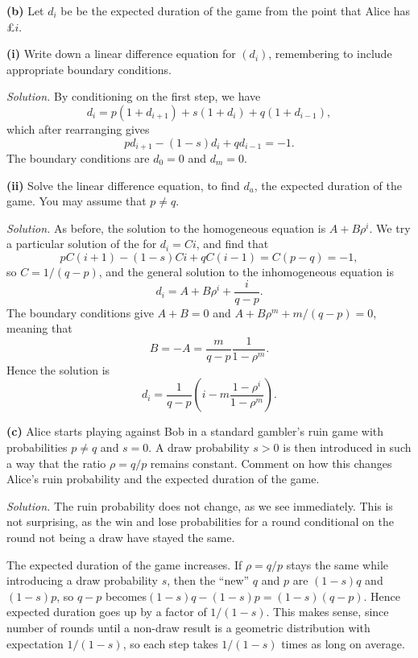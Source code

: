 \documentclass[
  a4paper,
]{article}
\theoremstyle{definition}
\theoremstyle{definition}
\theoremstyle{definition}
\theoremstyle{remark}
\begin{document}
\textbf{(b)} Let \(d_i\) be be the expected duration of the game from the point that Alice has £\(i\).

\textbf{(i)} Write down a linear difference equation for \((d_i)\), remembering to include appropriate boundary conditions.

\begin{myanswers}
\emph{Solution.} By conditioning on the first step, we have
\[ d_i = p(1 + d_{i+1}) + s(1 + d_i) + q(1 + d_{i-1}) ,  \]
which after rearranging gives
\[ pd_{i+1} - (1-s)d_i + qd_{i-1} = -1.  \]
The boundary conditions are \(d_0 = 0\) and \(d_m = 0\).

\end{myanswers}

\textbf{(ii)} Solve the linear difference equation, to find \(d_a\), the expected duration of the game. You may assume that \(p \neq q\).

\begin{myanswers}
\emph{Solution.} As before, the solution to the homogeneous equation is \(A + B\rho^i\). We try a particular solution of the for \(d_i = Ci\), and find that
\[ pC(i+1) -(1-s)Ci + qC(i-1) = C(p-q) = -1 ,\]
so \(C= 1/(q-p)\), and the general solution to the inhomogeneous equation is
\[ d_i = A + B\rho^i + \frac{i}{q-p} .  \]
The boundary conditions give \(A + B = 0\) and \(A + B \rho^m + m/(q-p) = 0\), meaning that
\[ B = -A = \frac{m}{q-p} \frac{1}{1-\rho^m} . \]
Hence the solution is
\[ d_i = \frac{1}{q-p} \left(i - m\frac{1-\rho^i}{1-\rho^m} \right) .   \]

\end{myanswers}

\textbf{(c)} Alice starts playing against Bob in a standard gambler's ruin game with probabilities \(p \neq q\) and \(s = 0\). A draw probability \(s > 0\) is then introduced in such a way that the ratio \(\rho = q/p\) remains constant. Comment on how this changes Alice's ruin probability and the expected duration of the game.

\begin{myanswers}
\emph{Solution.} The ruin probability does not change, as we see immediately. This is not surprising, as the win and lose probabilities for a round conditional on the round not being a draw have stayed the same.

The expected duration of the game increases. If \(\rho = q/p\) stays the same while introducing a draw probability \(s\), then the ``new'' \(q\) and \(p\) are \((1-s)q\) and \((1-s)p\), so \(q-p\) becomes\((1-s)q - (1-s)p = (1-s)(q-p)\). Hence expected duration goes up by a factor of \(1/(1-s)\). This makes sense, since number of rounds until a non-draw result is a geometric distribution with expectation \(1/(1-s)\), so each step takes \(1/(1-s)\) times as long on average.

\end{myanswers}
\end{document}
